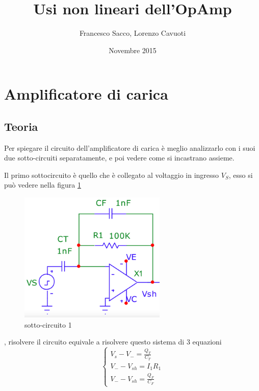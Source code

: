 \documentclass{article}
\date{Novembre 2015}
\author{Francesco Sacco, Lorenzo Cavuoti}
\title{Usi non lineari dell'OpAmp}
\begin{document}
	\maketitle
	\section{Amplificatore di carica}
	\subsection{Teoria}
		Per spiegare il circuito dell'amplificatore di carica è meglio analizzarlo con i suoi due sotto-circuiti separatamente, e poi vedere come si incastrano assieme.\newline

		Il primo sottocircuito è quello che è collegato al voltaggio in ingresso $V_S$, esso si può vedere nella figura \ref{fig:circ1}
		\begin{figure}
			\label{fig:circ1}
			\centering
			\includegraphics[width=70mm]{immagini/circ1.png}
			\caption{sotto-circuito 1}
		\end{figure}
		, risolvere il circuito equivale a risolvere questo sistema di 3 equazioni
		\begin{equation}
			\begin{cases}
				V_s-V_-=\frac{Q_T}{C_T}\\
				V_--V_{sh}=I_1R_1\\
				V_--V_{sh}=\frac{Q_F}{C_F}
			\end{cases}
		\end{equation}
\end{document}
